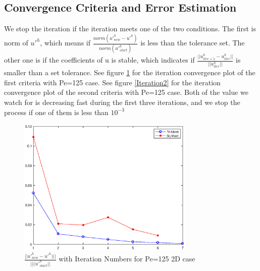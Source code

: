 \documentclass[10pt]{article}
\begin{document}
\subsection{Convergence Criteria and Error Estimation}
\label{error}
We stop the iteration if the iteration meets one of the two conditions. The first is norm of $u'^{h}$, which means if $\frac{norm(u'^{h}_{new}-u'^{h})}{norm(u'^{h}_{start})}$ is less than the tolerance set. The other one is if the coefficients of u is stable, which indicates if $\frac{||u^{h}_{iter+1}-u^{h}_{iter}||}{||u^{h}_{iter}||}$ is smaller than a set tolerance. See figure \ref{Iteration} for the iteration convergence plot of the first criteria with Pe=125 case. See figure \ref{Iteration2} for the iteration convergence plot of the second criteria with Pe=125 case. Both of the value we watch for is decreasing fast during the first three iterations, and we stop the process if one of them is less than $10^{-3}$\\

\begin{figure}[h!]
	\begin{center}
	\includegraphics[width=0.75\textwidth, clip]{./figure/uprime.eps}
	\end{center}
		\vspace{0mm}
    \caption{$\frac{||u'^{h}_{new}-u'^{h})||}{||(u'^{h}_{start}||}$ with Iteration Numbers for Pe=125 2D case}
  	\label{Iteration}
\end{figure}
\end{document}
